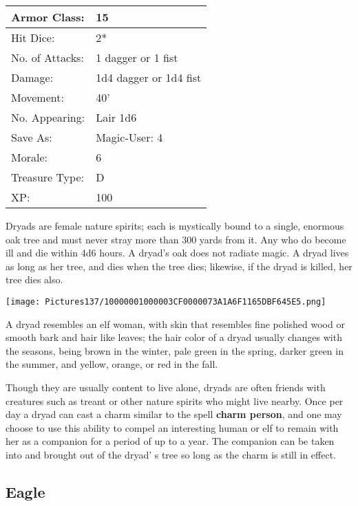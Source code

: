 \documentclass[a4paper,twoside,openany,10pt]{book}
\begin{document}
\begin{multicols}{2}
\begin{tabularx}{0.48\textwidth}{@{}lX@{}}
Armor Class: & 15 \\\hline
Hit Dice: & 2* \\\hline
No. of Attacks: & 1 dagger or 1 fist \\\hline
Damage: & 1d4 dagger or 1d4 fist \\\hline
Movement: & 40' \\\hline
No. Appearing: & Lair 1d6 \\\hline
Save As: & Magic-User: 4 \\\hline
Morale: & 6 \\\hline
Treasure Type: & D \\\hline
XP: & 100 \\\hline
\end{tabularx}\medskip

Dryads are female nature spirits; each is mystically bound to a single, enormous oak tree and must never stray more than 300 yards from it. Any who do become ill and die within 4d6 hours. A dryad's oak does not radiate magic. A dryad lives as long as her tree, and dies when the tree dies; likewise, if the dryad is killed, her tree dies also.

\begin{center}
	\texttt{[image: Pictures137/10000001000003CF0000073A1A6F1165DBF645E5.png]}\medskip
\end{center}


A dryad resembles an elf woman, with skin that resembles fine polished wood or smooth bark and hair like leaves; the hair color of a dryad usually changes with the seasons, being brown in the winter, pale green in the spring, darker green in the summer, and yellow, orange, or red in the fall.

Though they are usually content to live alone, dryads are often friends with creatures such as treant or other nature spirits who might live nearby. Once per day a dryad can cast a charm similar to the spell \textbf{charm person}, and one may choose to use this ability to compel an interesting human or elf to remain with her as a companion for a period of up to a year. The companion can be taken into and brought out of the dryad' s tree so long as the charm is still in effect.\\


\subsection*{Eagle}\label{eagle}


\end{multicols}
\end{document}
